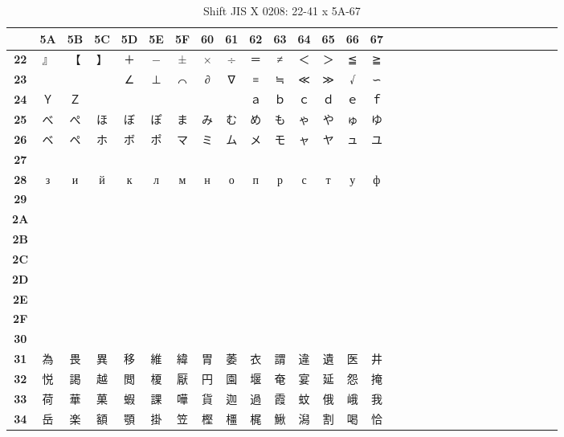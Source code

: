 \begin{table}[H]
\Fontified
\centering
\caption{Shift JIS X 0208: 22-41 x 5A-67}
\begin{tabular}{|Sc|Sc|Sc|Sc|Sc|Sc|Sc|Sc|Sc|Sc|Sc|Sc|Sc|Sc|Sc|}
\hline
 & \textbf{5A} & \textbf{5B} & \textbf{5C} & \textbf{5D} & \textbf{5E} & \textbf{5F} & \textbf{60} & \textbf{61} & \textbf{62} & \textbf{63} & \textbf{64} & \textbf{65} & \textbf{66} & \textbf{67} \\ \hline
\textbf{22} & 』 & 【 & 】 & ＋ & − & ± & × & ÷ & ＝ & ≠ & ＜ & ＞ & ≦ & ≧ \\ \hline
\textbf{23} &  &  &  & ∠ & ⊥ & ⌒ & ∂ & ∇ & ≡ & ≒ & ≪ & ≫ & √ & ∽ \\ \hline
\textbf{24} & Ｙ & Ｚ &  &  &  &  &  &  & ａ & ｂ & ｃ & ｄ & ｅ & ｆ \\ \hline
\textbf{25} & べ & ぺ & ほ & ぼ & ぽ & ま & み & む & め & も & ゃ & や & ゅ & ゆ \\ \hline
\textbf{26} & ベ & ペ & ホ & ボ & ポ & マ & ミ & ム & メ & モ & ャ & ヤ & ュ & ユ \\ \hline
\textbf{27} &  &  &  &  &  &  &  &  &  &  &  &  &  &  \\ \hline
\textbf{28} & з & и & й & к & л & м & н & о & п & р & с & т & у & ф \\ \hline
\textbf{29} &  &  &  &  &  &  &  &  &  &  &  &  &  &  \\ \hline
\textbf{2A} &  &  &  &  &  &  &  &  &  &  &  &  &  &  \\ \hline
\textbf{2B} &  &  &  &  &  &  &  &  &  &  &  &  &  &  \\ \hline
\textbf{2C} &  &  &  &  &  &  &  &  &  &  &  &  &  &  \\ \hline
\textbf{2D} &  &  &  &  &  &  &  &  &  &  &  &  &  &  \\ \hline
\textbf{2E} &  &  &  &  &  &  &  &  &  &  &  &  &  &  \\ \hline
\textbf{2F} &  &  &  &  &  &  &  &  &  &  &  &  &  &  \\ \hline
\textbf{30} &  &  &  &  &  &  &  &  &  &  &  &  &  &  \\ \hline
\textbf{31} & 為 & 畏 & 異 & 移 & 維 & 緯 & 胃 & 萎 & 衣 & 謂 & 違 & 遺 & 医 & 井 \\ \hline
\textbf{32} & 悦 & 謁 & 越 & 閲 & 榎 & 厭 & 円 & 園 & 堰 & 奄 & 宴 & 延 & 怨 & 掩 \\ \hline
\textbf{33} & 荷 & 華 & 菓 & 蝦 & 課 & 嘩 & 貨 & 迦 & 過 & 霞 & 蚊 & 俄 & 峨 & 我 \\ \hline
\textbf{34} & 岳 & 楽 & 額 & 顎 & 掛 & 笠 & 樫 & 橿 & 梶 & 鰍 & 潟 & 割 & 喝 & 恰 \\ \hline

\end{tabular}
\end{table}
